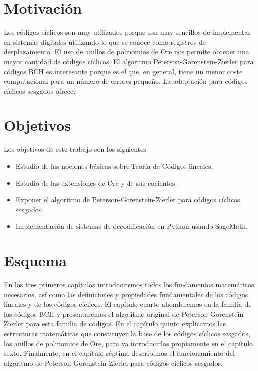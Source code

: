 \section*{Motivación}

Los códigos cíclicos son muy utilizados porque son muy sencillos de implementar en sistemas digitales utilizando lo que se conoce como registros de desplazamiento.
El uso de anillos de polinomios de Ore nos permite obtener una mayor cantidad de códigos cíclicos.
El algoritmo Peterson-Gorenstein-Zierler para códigos BCH es interesante porque es el que, en general, tiene un menor coste computacional para un número de errores pequeño.
La adaptación para códigos cíclicos sesgados ofrece.

\section*{Objetivos}

Los objetivos de este trabajo son los siguientes. \begin{itemize}
  \item Estudio de las nociones básicas sobre Teoría de Códigos lineales.
  \item Estudio de las extensiones de Ore y de sus cocientes.
  \item Exponer el algoritmo de Peterson-Gorenstein-Zierler para códigos cíclicos sesgados.
  \item Implementación de sistemas de decodificación en Python usando SageMath.
\end{itemize}

\section*{Esquema}

En los tres primeros capítulos introduciremos todos los fundamentos matemáticos necesarios, así como las definiciones y propiedades fundamentales de los códigos lineales y de los códigos cíclicos.
El capítulo cuarto ahondaremos en la familia de los códigos BCH y presentaremos el algoritmo original de Peterson-Gorenstein-Zierler para esta familia de códigos.
En el capítulo quinto explicamos las estructuras matemáticas que constituyen la base de los códigos cíclicos sesgados, los anillos de polinomios de Ore, para ya introducirlos propiamente en el capítulo sexto.
Finalmente, en el capítulo séptimo describimos el funcionamiento del algoritmo de Peterson-Gorenstein-Zierler para códigos cíclicos sesgados.



